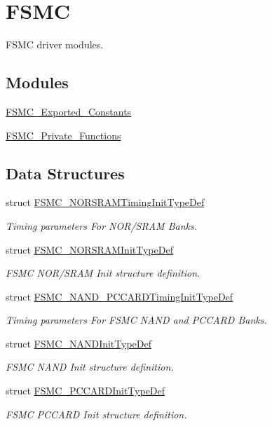 \hypertarget{group___f_s_m_c}{\section{F\-S\-M\-C}
\label{group___f_s_m_c}
}


F\-S\-M\-C driver modules.  


\subsection*{Modules}
\begin{DoxyCompactItemize}
\item 
\hyperlink{group___f_s_m_c___exported___constants}{F\-S\-M\-C\-\_\-\-Exported\-\_\-\-Constants}
\item 
\hyperlink{group___f_s_m_c___private___functions}{F\-S\-M\-C\-\_\-\-Private\-\_\-\-Functions}
\end{DoxyCompactItemize}
\subsection*{Data Structures}
\begin{DoxyCompactItemize}
\item 
struct \hyperlink{struct_f_s_m_c___n_o_r_s_r_a_m_timing_init_type_def}{F\-S\-M\-C\-\_\-\-N\-O\-R\-S\-R\-A\-M\-Timing\-Init\-Type\-Def}
\begin{DoxyCompactList}\small\item\em Timing parameters For N\-O\-R/\-S\-R\-A\-M Banks. \end{DoxyCompactList}\item 
struct \hyperlink{struct_f_s_m_c___n_o_r_s_r_a_m_init_type_def}{F\-S\-M\-C\-\_\-\-N\-O\-R\-S\-R\-A\-M\-Init\-Type\-Def}
\begin{DoxyCompactList}\small\item\em F\-S\-M\-C N\-O\-R/\-S\-R\-A\-M Init structure definition. \end{DoxyCompactList}\item 
struct \hyperlink{struct_f_s_m_c___n_a_n_d___p_c_c_a_r_d_timing_init_type_def}{F\-S\-M\-C\-\_\-\-N\-A\-N\-D\-\_\-\-P\-C\-C\-A\-R\-D\-Timing\-Init\-Type\-Def}
\begin{DoxyCompactList}\small\item\em Timing parameters For F\-S\-M\-C N\-A\-N\-D and P\-C\-C\-A\-R\-D Banks. \end{DoxyCompactList}\item 
struct \hyperlink{struct_f_s_m_c___n_a_n_d_init_type_def}{F\-S\-M\-C\-\_\-\-N\-A\-N\-D\-Init\-Type\-Def}
\begin{DoxyCompactList}\small\item\em F\-S\-M\-C N\-A\-N\-D Init structure definition. \end{DoxyCompactList}\item 
struct \hyperlink{struct_f_s_m_c___p_c_c_a_r_d_init_type_def}{F\-S\-M\-C\-\_\-\-P\-C\-C\-A\-R\-D\-Init\-Type\-Def}
\begin{DoxyCompactList}\small\item\em F\-S\-M\-C P\-C\-C\-A\-R\-D Init structure definition. \end{DoxyCompactList}\end{DoxyCompactItemize}
